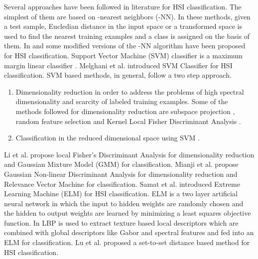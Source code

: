 \documentclass[journal]{IEEEtran}
\begin{document}
\indent Several approaches have been followed in literature for HSI classification. The simplest of them are based on -nearest neighbors (-NN). In these methods, given a test sample, Eucledian distance in the input space or a transformed space is used to find the  nearest training examples and a class is assigned on the basis of them. In \cite{Blanzieri:2008} and \cite{Li:2015} some modified versions of the -NN algorithm have been proposed for HSI classification. Support Vector Machine (SVM) classifier is a maximum margin linear classifier \cite{Burges:1998}. Melghani et al.\cite{Melgani:2004} introduced SVM Classifier for HSI classification. SVM based methods, in general, follow a two step approach.
\begin{enumerate}
\item Dimensionality reduction in order to address the problems of high spectral dimensionality and scarcity of labeled training examples. Some of the methods followed for dimensionality reduction are subspace projection \cite{Gao:2015}, random feature selection \cite{Waske:2010} and Kernel Local Fisher Discriminant Analysis \cite{Li:2011}.
\item Classification in the reduced dimensional space using SVM \cite{Li:2012,Melgani:2004,Gao:2015}.
\end{enumerate}
Li et al. \cite{Li:2012} propose local Fisher's Discriminant Analysis for dimensionality reduction and Gaussian Mixture Model (GMM) for classification. Mianji et al. \cite{Mianji:2011} propose Gaussian Non-linear Discriminant Analysis for dimensionality reduction and Relevance Vector Machine for classification. Samat et al. \cite{Samat:2014} introduced Extreme Learning Machine (ELM) for HSI classification. ELM \cite{Huang:2006} is a two layer artificial neural network in which the input to hidden weights are randomly chosen and the hidden to output weights are learned by minimizing a least squares objective function. In \cite{Li:2015} LBP is used to extract texture based local descriptors which are combined with global descriptors like Gabor and spectral features and fed into an ELM for classification. Lu et al. \cite{Lu:2016} proposed a set-to-set distance based method for HSI classification.\\
\end{document}
